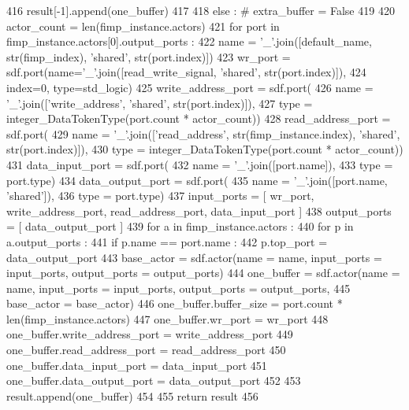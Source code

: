 \begin{DoxyCode}
416         result[-1].append(one\_buffer)
417 
418   \textcolor{keywordflow}{else} : \textcolor{comment}{# extra\_buffer = False}
419 
420     actor\_count = len(fimp\_instance.actors)
421     \textcolor{keywordflow}{for} port \textcolor{keywordflow}{in} fimp\_instance.actors[0].output\_ports :
422       name = \textcolor{stringliteral}{'\_'}.join([default\_name, str(fimp\_index), \textcolor{stringliteral}{'shared'}, str(port.index)])
423       wr\_port = sdf.port(name=\textcolor{stringliteral}{'\_'}.join([read\_write\_signal, \textcolor{stringliteral}{'shared'}, str(port.index)]),
424         index=0, type=std\_logic)
425       write\_address\_port = sdf.port(
426         name = \textcolor{stringliteral}{'\_'}.join([\textcolor{stringliteral}{'write\_address'}, \textcolor{stringliteral}{'shared'}, str(port.index)]),
427         type = integer\_DataTokenType(port.count * actor\_count))
428       read\_address\_port = sdf.port(
429         name = \textcolor{stringliteral}{'\_'}.join([\textcolor{stringliteral}{'read\_address'}, str(fimp\_instance.index), \textcolor{stringliteral}{'shared'}, str(port.index)]),
430         type = integer\_DataTokenType(port.count * actor\_count))
431       data\_input\_port = sdf.port(
432         name = \textcolor{stringliteral}{'\_'}.join([port.name]),
433         type = port.type)
434       data\_output\_port = sdf.port(
435         name = \textcolor{stringliteral}{'\_'}.join([port.name, \textcolor{stringliteral}{'shared'}]),
436         type = port.type)
437       input\_ports = [ wr\_port, write\_address\_port, read\_address\_port, data\_input\_port ]
438       output\_ports = [ data\_output\_port ]
439       \textcolor{keywordflow}{for} a \textcolor{keywordflow}{in} fimp\_instance.actors :
440         \textcolor{keywordflow}{for} p \textcolor{keywordflow}{in} a.output\_ports :
441           \textcolor{keywordflow}{if} p.name == port.name :
442             p.top\_port = data\_output\_port
443       base\_actor = sdf.actor(name = name, input\_ports = input\_ports, output\_ports = output\_ports)
444       one\_buffer = sdf.actor(name = name, input\_ports = input\_ports, output\_ports = output\_ports,
445         base\_actor = base\_actor)
446       one\_buffer.buffer\_size = port.count * len(fimp\_instance.actors)
447       one\_buffer.wr\_port = wr\_port
448       one\_buffer.write\_address\_port = write\_address\_port
449       one\_buffer.read\_address\_port = read\_address\_port
450       one\_buffer.data\_input\_port = data\_input\_port
451       one\_buffer.data\_output\_port = data\_output\_port
452 
453       result.append(one\_buffer)
454 
455   \textcolor{keywordflow}{return} result
456 
\end{DoxyCode}
\mbox{\label{namespacesylva_1_1code__generation_1_1air_a1a46162a8988513e15b0b45a4b456340}} 
